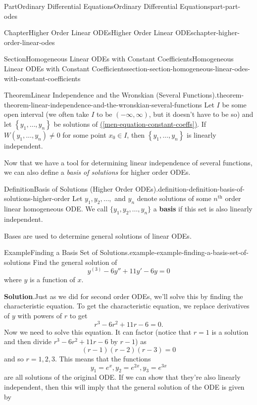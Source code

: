 \documentclass[twoside,10pt,]{book}
\newcommand{\blocktitlefont}{\relax}
\newcommand{\xreffont}{\relax}
\newcommand{\terminology}[1]{\textbf{#1}}
\numberwithin{equation}{part}
\newcommand{\set}[1]{\left\{ #1 \right\}}
\begin{document}
\begin{partptx}{Part}{Ordinary Differential Equations}{}{Ordinary Differential Equations}{}{}{part-part-odes}
\begin{chapterptx}{Chapter}{Higher Order Linear ODEs}{}{Higher Order Linear ODEs}{}{}{chapter-higher-order-linear-odes}
\begin{sectionptx}{Section}{Homogeneous Linear ODEs with Constant Coefficients}{}{Homogeneous Linear ODEs with Constant Coefficients}{}{}{section-section-homogeneous-linear-odes-with-constant-coefficients}
\begin{theorem}{Theorem}{Linear Independence and the Wronskian (Several Functions).}{}{theorem-theorem-linear-independence-and-the-wronskian-several-functions}
Let \(I\) be some open interval (we often take \(I\) to be \((-\infty,\infty)\), but it doesn't have to be so) and let \(\set{y_{1},\dots,y_{n}}\) be solutions of \hyperref[men-equation-constant-coeffs]{({\xreffont\ref{men-equation-constant-coeffs}})}. If \(W(y_{1},\dots,y_{n})\neq0\) for some point \(x_{0}\in I\), then \(\set{y_{1},\dots,y_{n}}\) is linearly independent.%
\end{theorem}
Now that we have a tool for determining linear independence of several functions, we can also define a \emph{basis of solutions} for higher order ODEs.%
\begin{definition}{Definition}{Basis of Solutions (Higher Order ODEs).}{definition-definition-basis-of-solutions-higher-order}%
%
Let \(y_{1}, y_{2},\ldots,\) and \(y_{n}\) denote solutions of some \(n^{\text{th}}\) order linear homogeneous ODE. We call \(\{y_{1},y_{2},\ldots,y_{n}\}\) a \terminology{basis} if this set is also linearly independent.%
\end{definition}
Bases are used to determine general solutions of linear ODEs.%
\begin{example}{Example}{Finding a Basis Set of Solutions.}{example-example-finding-a-basis-set-of-solutions}%
Find the general solution of%
\begin{equation*}
y^{(3)}-6y''+11y'-6y=0
\end{equation*}
where \(y\) is a function of \(x\).%
\par\smallskip%
\noindent\textbf{\blocktitlefont Solution}.\hypertarget{solution-example-finding-a-basis-set-of-solutions-c}{}\quad{}Just as we did for second order ODEs, we'll solve this by finding the characteristic equation. To get the characteristic equation, we replace derivatives of \(y\) with powers of \(r\) to get%
\begin{equation*}
r^{3}-6r^{2}+11r-6=0.
\end{equation*}
Now we need to solve this equation. It can factor (notice that \(r=1\) is a solution and then divide \(r^{3}-6r^{2}+11r-6\) by \(r-1\)) as%
\begin{equation*}
(r-1)(r-2)(r-3)=0
\end{equation*}
and so \(r=1,2,3.\) This means that the functions%
\begin{equation*}
y_{1} = e^{x},y_{2} = e^{2x},y_{3} = e^{3x}
\end{equation*}
are all solutions of the original ODE. If we can show that they're also linearly independent, then this will imply that the general solution of the ODE is given by%

\end{example}
\end{sectionptx}
\end{chapterptx}
\end{partptx}
\end{document}
